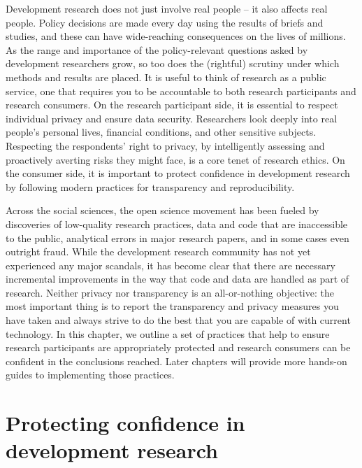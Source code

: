 
\begin{fullwidth}

	Development research does not just involve real people -- it also affects real people.
	Policy decisions are made every day using the results of briefs and studies,
	and these can have wide-reaching consequences on the lives of millions.
	As the range and importance of the policy-relevant questions asked by development researchers grow,
	so too does the (rightful) scrutiny under which methods and results are placed.
	It is useful to think of research as a public service,
	one that requires you to be accountable to both research participants and research consumers.
	On the research participant side,
	it is essential to respect individual privacy and ensure data security.
	Researchers look deeply into real people's personal lives, financial conditions, and other sensitive subjects.
	Respecting the respondents' right to privacy,
	by intelligently assessing and proactively averting risks they might face,
	is a core tenet of research ethics.
	On the consumer side, it is important to protect confidence in development research
	by following modern practices for transparency and reproducibility.

  Across the social sciences, the open science movement has been fueled by discoveries of low-quality research practices,
	data and code that are inaccessible to the public, analytical errors in major research papers,
	and in some cases even outright fraud. While the development research community has not yet
	experienced any major scandals, it has become clear that there are necessary incremental improvements
	in the way that code and data are handled as part of research.
	Neither privacy nor transparency is an all-or-nothing objective:
	the most important thing is to report the transparency and privacy measures you have taken
  and always strive to do the best that you are capable of with current technology.
	In this chapter, we outline a set of practices that help to ensure
	research participants are appropriately protected and
	research consumers can be confident in the conclusions reached.
  Later chapters will provide more hands-on guides to implementing those practices.

\end{fullwidth}


\section{Protecting confidence in development research}

